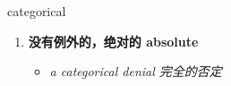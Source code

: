 
\begin{frame}
{\huge categorical}
\begin{center}
\begin{enumerate}\Large
  \item \textbf{没有例外的，绝对的 absolute}
  \begin{itemize}
    \item \em{\Large{a categorical denial 完全的否定}}
  \end{itemize}
\end{enumerate}
\end{center}
\end{frame}

